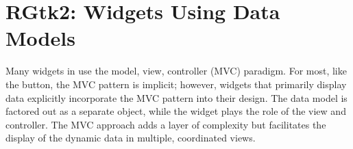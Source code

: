 \begin{Schunk}
\end{Schunk}





\chapter{RGtk2: Widgets Using Data Models}
\label{sec:RGtk2:widgets-with-models}



Many widgets in \GTK\/ use the model, view, controller (MVC)
paradigm. For most, like the button, the MVC pattern is implicit;
however, widgets that primarily display data explicitly incorporate
the MVC pattern into their design. The data model is factored out as a
separate object, while the widget plays the role of the view and
controller. The MVC approach adds a layer of complexity but
facilitates the display of the dynamic data in multiple, coordinated
views.


